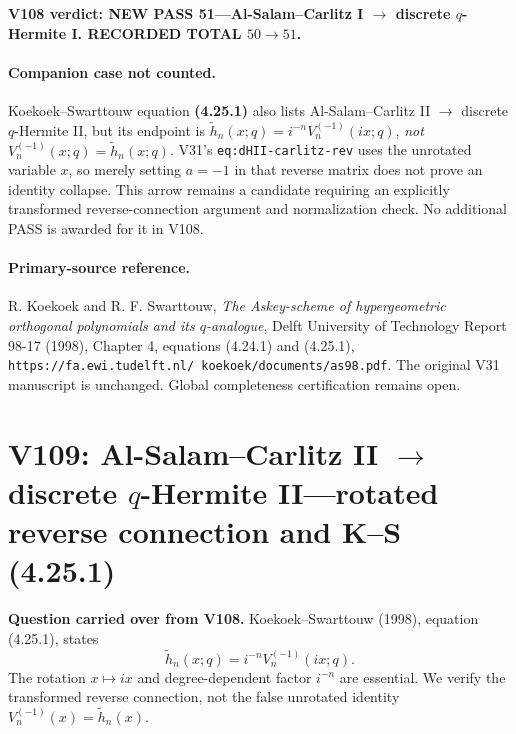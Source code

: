 \documentclass[11pt]{article}
\begin{document}
\noindent\textbf{V108 verdict: NEW PASS 51---Al-Salam--Carlitz I $\to$ discrete $q$-Hermite I. RECORDED TOTAL $50\to51$.}

\paragraph{Companion case not counted.}
Koekoek--Swarttouw equation \textbf{(4.25.1)} also lists Al-Salam--Carlitz II $\to$ discrete $q$-Hermite II, but its endpoint is
$\widetilde h_n(x;q)=i^{-n}V_n^{(-1)}(ix;q)$, \emph{not} $V_n^{(-1)}(x;q)=\widetilde h_n(x;q)$. V31's \texttt{eq:dHII-carlitz-rev} uses the unrotated variable $x$, so merely setting $a=-1$ in that reverse matrix does not prove an identity collapse. This arrow remains a candidate requiring an explicitly transformed reverse-connection argument and normalization check. No additional PASS is awarded for it in V108.

\paragraph{Primary-source reference.} R. Koekoek and R. F. Swarttouw, \emph{The Askey-scheme of hypergeometric orthogonal polynomials and its $q$-analogue}, Delft University of Technology Report 98-17 (1998), Chapter 4, equations (4.24.1) and (4.25.1), \texttt{https://fa.ewi.tudelft.nl/\string~koekoek/documents/as98.pdf}. The original V31 manuscript is unchanged. Global completeness certification remains open.


\clearpage
\section{V109: Al-Salam--Carlitz II $\to$ discrete $q$-Hermite II---rotated reverse connection and K--S (4.25.1)}
\noindent\textbf{Question carried over from V108.} Koekoek--Swarttouw (1998), equation (4.25.1), states
\begin{equation}\label{eq:v109-target}
 \widetilde h_n(x;q)=i^{-n}V_n^{(-1)}(ix;q).
\end{equation}
The rotation $x\mapsto ix$ and degree-dependent factor $i^{-n}$ are essential. We verify the transformed reverse connection, not the false unrotated identity $V_n^{(-1)}(x)=\widetilde h_n(x)$.
\end{document}
